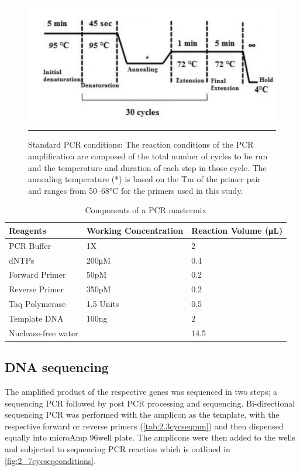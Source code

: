 \begin{figure}[!tb]
\centering
\includegraphics[width=\linewidth]{Figures/2_6pcrconditions.pdf} 
\rule{35em}{0.5pt}
\caption{Standard PCR conditions: The reaction conditions of the PCR amplification are composed of the total number of cycles to be run and the temperature and duration of each step in those cycle. The annealing temperature (*) is based on the Tm of the primer pair and ranges from 50–68°C for the primers used in this study.}
\label{fig:2_6pcrconditions}
\end{figure}

\begin{table}[!h]
\centering
\caption{Components of a PCR mastermix}
\label{tab:2.2pcrmm}
\begin{tabular}{ | l | l | l | }
\hline
	Reagents & Working Concentration & Reaction Volume (μL) \\ \hline
	PCR Buffer & 1X & 2 \\ \hline
	dNTPs & 200μM & 0.4 \\ \hline
	Forward Primer & 50pM & 0.2 \\ \hline
	Reverse Primer & 350pM & 0.2 \\ \hline
	Taq Polymerase & 1.5 Units & 0.5 \\ \hline
	Template DNA & 100ng & 2 \\ \hline
	Nuclease-free water &  & 14.5 \\ \hline
\end{tabular}
\end{table}

\subsection{DNA sequencing} 
The amplified product of the respective genes was sequenced in two steps; a sequencing PCR followed by post PCR processing and sequencing.  Bi-directional sequencing PCR was performed with the amplicon as the template, with the respective forward or reverse primers (\cref{tab:2.3cycseqmm}) and then dispensed equally into microAmp 96well plate. The amplicons were then added to the wells and subjected to sequencing PCR reaction which is outlined in \cref{fig:2_7cycseqconditions}.


